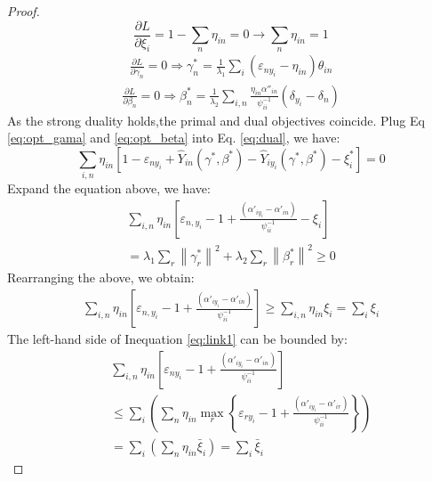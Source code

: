 \begin{proof}
\begin{equation*}
\frac{{\partial L}}{{\partial {\xi _i}}} = 1 - \sum\limits_n {{\eta _{in}}}  = 0 \to \sum\limits_n {{\eta _{in}}}  = 1
\end{equation*}   
\begin{eqnarray}\label{eq:opt_gama}
\frac{{\partial L}}{{\partial {\gamma _n}}} = 0  
\Rightarrow  \gamma _n^* = \frac{1}{{{\lambda _1}}}\sum\limits_i {\left( {{\varepsilon _{n{y_i}}} - {\eta _{in}}} \right){\theta _{in}}} 
\end{eqnarray}
\begin{eqnarray}\label{eq:opt_beta}
\frac{{\partial L}}{{\partial {\beta _n}}}  = 0 
\Rightarrow \beta _n^* = \frac{1}{{{\lambda _2}}}\sum\limits_{i,n} {\frac{{{\eta _{in}}{{\alpha ''}_{in}}}}{{\psi _{ii}^{ - 1}}}\left( {{\delta _{{y_i}}} - {\delta _n}} \right)} 
\end{eqnarray}
As the strong duality holds,the primal and dual objectives coincide. Plug Eq \eqref{eq:opt_gama} and \eqref{eq:opt_beta} into Eq. \eqref{eq:dual}, we have:
\begin{equation*}
\sum\limits_{i,n} {{\eta _{in}}\left[ {1 - {\varepsilon _{n{y_i}}} + {{\hat Y}_{in}}\left( {\gamma^* ,\beta^* } \right) - {{\hat Y}_{i{y_i}}}\left( {\gamma^* ,\beta^* } \right) - {\xi _i^*}} \right]}=0
\end{equation*}
Expand the equation above, we have:
\begin{eqnarray}\nonumber
\sum\limits_{i,n} {{\eta _{in}}\left[ { {\varepsilon _{n,{y_i}}}-1 + \frac{{\left( {{{\alpha '}_{i{y_i}}} - {{\alpha '}_{in}}} \right)}}{{\psi_{ii}^{ - 1}}} - {\xi _i}} \right]} \nonumber\\ 
= {\lambda _1}\sum\limits_r {{{\left\| {\gamma _r^*} \right\|}^2}}  + {\lambda _2}\sum\limits_r {{{\left\| {\beta _r^*} \right\|}^2}}  \ge 0\nonumber
\end{eqnarray}
Rearranging the above, we obtain:
\begin{eqnarray}\label{eq:link1}
\sum\limits_{i,n} {{\eta _{in}}\left[ { {\varepsilon _{n,{y_i}}} -1+ \frac{{\left( {{{\alpha '}_{i{y_i}}} - {{\alpha '}_{in}}} \right)}}{{\psi_{ii}^{ - 1}}}} \right]}  
 \ge \sum\limits_{i,n} {{\eta _{in}}{\xi _i}}  = \sum\limits_i {{\xi _i}} 
\end{eqnarray}
The left-hand side of Inequation \eqref{eq:link1} can be bounded by:
\begin{eqnarray}
&&\sum\limits_{i,n} {{\eta _{in}}\left[ { {\varepsilon _{n{y_i}}}-1 + \frac{{\left( {{{\alpha '}_{i{y_i}}} - {{\alpha '}_{in}}} \right)}}{{\psi_{ii}^{ - 1}}}} \right]} \nonumber\\ &&\le \sum\limits_i {\left( {\sum\limits_n {{\eta _{in}}\mathop {\max }\limits_r \left\{ { {\varepsilon _{r{y_i}}} -1 + \frac{{\left( {{{\alpha '}_{i{y_i}}} - {{\alpha '}_{ir}}} \right)}}{{\psi_{ii}^{ - 1}}}} \right\}} } \right)}  \nonumber\\
&&= \sum\limits_i {\left( {\sum\limits_n {{\eta _{in}}{{\bar \xi }_i}} } \right)}  = \sum\limits_i {\bar \xi_i }
\end{eqnarray}
\end{proof}
